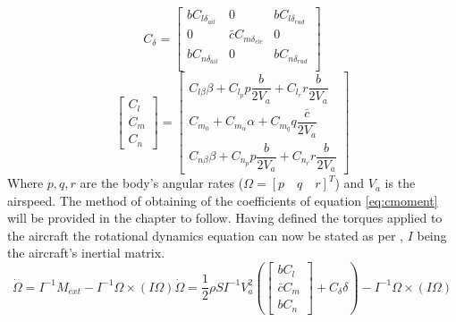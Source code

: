 \begin{equation}
C_\delta = 
\begin{bmatrix}
bC_{l\delta_{ail}} & 0 & bC_{l\delta_{rud}} \\
0 & \bar{c}C_{m\delta_{ele}} & 0 \\
bC_{n\delta_{ail}} & 0 & bC_{n\delta_{rud}}\\
\end{bmatrix}
\label{eq:cdelta}
\end{equation}
\begin{equation}
\begin{bmatrix}
C_l\\
C_m\\
C_n
\end{bmatrix} 
=
\begin{bmatrix}
C_{l\beta} \beta + C_{l_p} p \dfrac{b}{2V_a} + C_{l_r} r \dfrac{b}{2V_a}\\
C_{m_0} + C_{m_\alpha} \alpha + C_{m_q} q \dfrac{\bar{c}}{2V_a}\\
C_{n\beta} \beta + C_{n_p} p \dfrac{b}{2V_a} + C_{n_r} r \dfrac{b}{2V_a}
\end{bmatrix}
\label{eq:cmoment}
\end{equation}
Where $p, q, r$ are the body's angular rates ($\Omega = [p\quad q\quad  r]^T$) and $V_a$ is the airspeed. The method of obtaining of the coefficients of equation \ref{eq:cmoment} will be provided in the chapter to follow. Having defined the torques applied to the aircraft the rotational dynamics equation can now be stated as per \cite{hector}, $I$ being the aircraft's inertial matrix.
\begin{subequations}
	\begin{equation}
		\dot{\Omega} = I^{-1} M_{ext} - I^{-1}\Omega \times (I\Omega)
	\end{equation}
	\begin{equation}
		\dot{\Omega} = 
		\dfrac{1}{2}\rho S I^{-1} V_a^2\left(
		\begin{bmatrix}
			bC_l\\
			\bar{c}C_m\\
			bC_n
		\end{bmatrix}
		+ C_\delta \delta\right)
		- I^{-1}\Omega \times (I\Omega)	
	\end{equation}

\label{eq:fast_dynamics}
\end{subequations}

